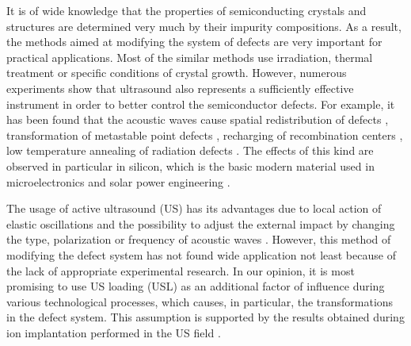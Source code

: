 \documentclass[%
 aip,
 amsmath,amssymb,
 reprint,%
]{revtex4-1}
\begin{document}
It is of wide knowledge that the properties of semiconducting crystals and structures are determined very much by their impurity compositions.
As a result, the methods aimed at modifying the system of defects are very important for practical applications.
Most of the similar methods use irradiation, thermal treatment or specific conditions of crystal growth.
However, numerous experiments show that ultrasound also represents a sufficiently effective instrument in order to better control the semiconductor defects.
For example, it has been found that the acoustic waves cause
spatial redistribution of defects \cite{Roman:2010JAP,GORB2020,Ostapenko1999,Zaveryukhin2002,Zaver:2008,OstapSC},
transformation of metastable point defects \cite{buyanova1994,Ostrovskii2001,Wosinski},
recharging of recombination centers \cite{Olikh:Ultras,Korotchenkov1995},
low temperature annealing of radiation defects \cite{Podolian2012,YOlikh2006TPL,UST:OstrovCsI,Parchinskii2006,UST:LED_SM}.
The effects of this kind are observed in particular in silicon, which is the basic modern material used in microelectronics and solar power engineering \cite{Roman:2010JAP,GORB2020,Zaver:2008,Roman:2007APL,OlikhJAP,Ostrovskii2001,Podolian2012,Parchinskii2006}.

The usage of active ultrasound (US) has its advantages due to 
local action of elastic oscillations 
and the possibility to adjust the external impact by changing the type, polarization or frequency of acoustic waves \cite{Olikh2018JAP}. 
However, this method of modifying the defect system has not found wide application not least because of the lack of appropriate experimental research. 
In our opinion, it is most promising to use US loading (USL) as an additional factor of influence during various technological processes, which causes, in particular, the transformations in the defect system. 
This assumption is supported by the results obtained during ion implantation performed in the US field \cite{Roman:2010JAP,Roman:2007APL,Roman:2006JAP}.
\end{document}
